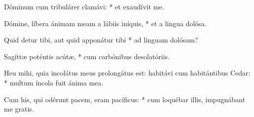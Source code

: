 \begin{psalmus}

 Dóminum cum tribulárer clamávi: * et exaudívit me.

Dómine, líbera ánimam meam a lábiis iníquis, * et a lingua dolósa.

Quid detur tibi, aut quid apponátur tibi * ad linguam dolósam?

Sagíttæ poténtis acútæ, * cum carbónibus desolatóriis.

Heu mihi, quia incolátus meus prolongátus est: habitávi cum habitántibus Cedar: * multum íncola fuit ánima mea.

Cum his, qui odérunt pacem, eram pacíficus: * cum loquébar illis, impugnábant me gratis.

\end{psalmus}
